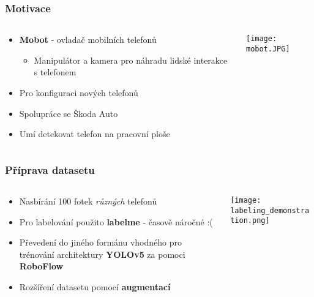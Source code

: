 \begin{frame}
   \frametitle{Motivace}
   \begin{columns}[t, onlytextwidth]
      \begin{column}[T]{0.5\textwidth}
         \begin{itemize}
            \item \textbf{Mobot} - ovladač mobilních telefonů
		\begin{itemize}
			\item Manipulátor a kamera pro náhradu lidské interakce s telefonem
		\end{itemize}
		\item Pro konfiguraci nových telefonů
		\item Spolupráce se Škoda Auto
		\item Umí detekovat telefon na pracovní ploše
         \end{itemize}
      \end{column}
      \begin{column}[T]{0.49\textwidth}
         \centering
         \texttt{[image: mobot.JPG]}
      \end{column}
   \end{columns}
\end{frame}

\begin{frame}
   \frametitle{Příprava datasetu}
   \begin{columns}[t, onlytextwidth]
      \begin{column}[T]{0.5\textwidth}
         \begin{itemize}
            \item Nasbírání 100 fotek \emph{různých} telefonů
            \item Pro labelování použito \textbf{labelme} - časově náročné :(
            \item Převedení do jiného formánu vhodného pro trénování architektury \textbf{YOLOv5} za pomoci \textbf{RoboFlow}
            \item Rozšíření datasetu pomocí \textbf{augmentací}
         \end{itemize}
      \end{column}
      \begin{column}[T]{0.49\textwidth}
         \centering
         \texttt{[image: labeling\_demonstration.png]}
      \end{column}
   \end{columns}
\end{frame}

